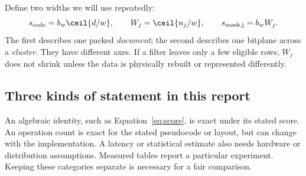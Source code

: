 Define two widths we will use repeatedly:
\begin{equation}
s_{\rm code}=b_w\ceil{d/w},\qquad
W_j=\ceil{n_j/w},\qquad s_{\rm mask,j}=b_w W_j.
\label{eq:widths}
\end{equation}
The first describes one packed \emph{document}; the second describes one bitplane across a
\emph{cluster}. They have different axes. If a filter leaves only a few eligible rows,
$W_j$ does not shrink unless the data is physically rebuilt or represented differently.

\subsection{Three kinds of statement in this report}
An algebraic identity, such as Equation~\eqref{eq:score}, is exact under its stated score.
An operation count is exact for the stated pseudocode or layout, but can change with the
implementation. A latency or statistical estimate also needs hardware or distribution
assumptions. Measured tables report a particular experiment. Keeping these categories separate
is necessary for a fair comparison.
